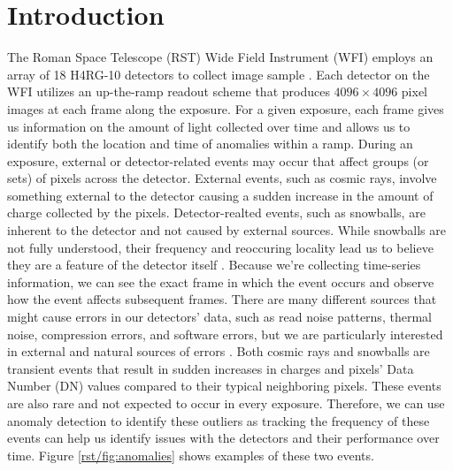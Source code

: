 \section{Introduction}
The Roman Space Telescope (RST) Wide Field Instrument (WFI) employs an array of 18 H4RG-10 detectors to collect image sample \parencite{Mosby_2020}.
Each detector on the WFI utilizes an up-the-ramp readout scheme that produces $4096 \times 4096$ pixel images at each frame along the exposure. 
For a given exposure, each frame gives us information on the amount of light collected over time and allows us to identify both the location and time of anomalies within a ramp.
During an exposure, external or detector-related events may occur that affect groups (or sets) of pixels across the detector. 
External events, such as cosmic rays, involve something external to the detector causing a sudden increase in the amount of charge collected by the pixels.
Detector-realted events, such as snowballs, are inherent to the detector and not caused by external sources.
While snowballs are not fully understood, their frequency and reoccuring locality lead us to believe they are a feature of the detector itself \parencite{cillis2018snowballs}.
Because we're collecting time-series information, we can see the exact frame in which the event occurs and observe how the event affects subsequent frames. 
There are many different sources that might cause errors in our detectors' data, such as read noise patterns, thermal noise, compression errors, and software errors, but we are particularly interested in external and natural sources of errors \parencite{cillis2018snowballs}. 
Both cosmic rays and snowballs are transient events that result in sudden increases in charges and pixels' Data Number (DN) values compared to their typical neighboring pixels.
These events are also rare and not expected to occur in every exposure.
Therefore, we can use anomaly detection to identify these outliers as tracking the frequency of these events can help us identify issues with the detectors and their performance over time.
Figure \ref{rst/fig:anomalies} shows examples of these two events.

